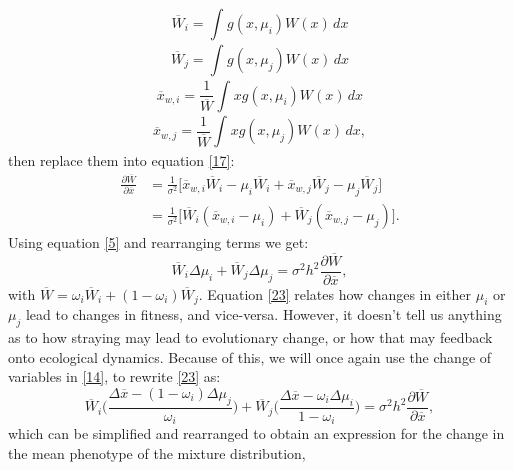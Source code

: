 \documentclass{revtex4}
\begin{document}
\begin{equation}\label{18}
\overline{W}_{i}=\int_{} g(x,\mu_{i})W(x)\,dx 
\end{equation}
\begin{equation}\label{19}
\overline{W}_{j}=\int_{} g(x,\mu_{j})W(x)\,dx  
\end{equation}
\begin{equation}\label{20}
\overline{x}_{w,i}=\frac{1}{\overline{W}}\int_{}xg(x,\mu_{i})W(x)\,dx
\end{equation}
\begin{equation}\label{21}
\overline{x}_{w,j}=\frac{1}{\overline{W}}\int_{}xg(x,\mu_{j})W(x)\,dx, 
\end{equation}
then replace them into equation \ref{17}:
\begin{equation}\label{22}
\begin{aligned}
\frac{\partial \overline{W}}{\partial \overline{x}} &=\frac{1}{\sigma^{2}}\Big[\overline{x}_{w,i} \overline{W}_{i} - \mu_{i}\overline{W}_{i} + \overline{x}_{w,j} \overline{W}_{j} - \mu_{j}\overline{W}_{j}\Big]  \\ 
&= \frac{1}{\sigma^{2}}\Big[ \overline{W}_{i}(\overline{x}_{w,i}-\mu_{i}) + \overline{W}_{j}(\overline{x}_{w,j}-\mu_{j})\Big].
\end{aligned}
\end{equation}
Using equation \ref{5} and rearranging terms we get:
\begin{equation}\label{23}
\overline{W}_{i}\Delta \mu_{i} + \overline{W}_{j}\Delta\mu_{j} = \sigma^{2}h^{2}\frac{\partial \overline{W}}{\partial \overline{x}} ,
\end{equation}
with $\overline{W}=\omega_i\overline{W}_{i}+(1-\omega_i)\overline{W}_{j}$. Equation \ref{23} relates how changes in either $\mu_{i}$ or $\mu_{j}$ lead to changes in fitness, and vice-versa. However, it doesn't tell us anything as to how straying may lead to evolutionary change, or how that may feedback onto ecological dynamics. Because of this, we will once again use the change of variables in \ref{14}, to rewrite \ref{23} as:
\begin{equation}\label{24}
\overline{W}_{i}\Big(\frac{\Delta\overline{x}-(1-\omega_i)\Delta\mu_{j}}{\omega_i} \Big)+\overline{W}_{j}\Big(\frac{\Delta\overline{x}-\omega_i\Delta\mu_{i}}{1-\omega_i} \Big)= \sigma^{2}h^{2}\frac{\partial \overline{W}}{\partial \overline{x}}, 
\end{equation}
which can be simplified and rearranged to obtain an expression for the change in the mean phenotype of the mixture distribution,
\end{document}
